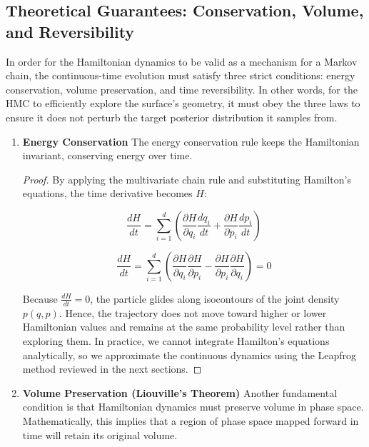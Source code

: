 \documentclass[12pt,oneside]{report}
\theoremstyle{definition}
\theoremstyle{remark}
\begin{document}
\subsection{Theoretical Guarantees: Conservation, Volume, and Reversibility}

In order for the Hamiltonian dynamics to be valid as a mechanism for a Markov chain, the continuous-time evolution must satisfy three strict conditions: energy conservation, volume preservation, and time reversibility. In other words, for the HMC to efficiently explore the surface's geometry, it must obey the three laws to ensure it does not perturb the target posterior distribution it samples from.

\begin{enumerate}
	\item \textbf{Energy Conservation}
The energy conservation rule keeps the Hamiltonian invariant, conserving energy over time. 

\begin{proof} 
By applying the multivariate chain rule and substituting Hamilton's equations, the time derivative becomes $H$:

\begin{equation}
\frac{dH}{dt} = \sum_{i=1}^d \left( \frac{\partial H}{\partial q_i} \frac{dq_i}{dt} + \frac{\partial H}{\partial p_i} \frac{dp_i}{dt} \right)
\label{energy_conservation}
\end{equation}

$$\frac{dH}{dt} = \sum_{i=1}^d \left( \frac{\partial H}{\partial q_i} \frac{\partial H}{\partial p_i} - \frac{\partial H}{\partial p_i} \frac{\partial H}{\partial q_i} \right) = 0$$


Because $\frac{dH}{dt} = 0$, the particle glides along isocontours of the joint density $p(q, p)$. Hence, the trajectory does not move toward higher or lower Hamiltonian values and remains at the same probability level rather than exploring them. In practice, we cannot integrate Hamilton's equations analytically, so we approximate the continuous dynamics using the Leapfrog method reviewed in the next sections.
\end{proof}

	\item \textbf{Volume Preservation (Liouville's Theorem)}
Another fundamental condition is that Hamiltonian dynamics must preserve volume in phase space. Mathematically, this implies that a region of phase space mapped forward in time will retain its original volume. 


\end{enumerate}
\end{document}
